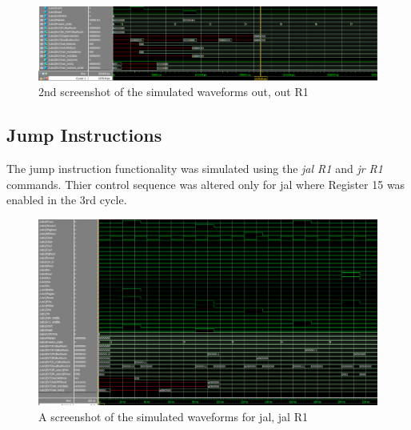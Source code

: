 \documentclass{article}
\begin{document}
        \begin{figure}[h!]
            \begin{center}
                \includegraphics[width=15cm]{out_wave_bottom_half.png}
                \caption{2nd screenshot of the simulated waveforms out, out R1}
            \end{center}
        \end{figure}
    
    \cleardoublepage

    \subsection{Jump Instructions}
    The jump instruction functionality was simulated using the \emph{jal R1} and \emph{jr R1} commands. Thier control sequence was altered only for jal where Register 15 was enabled in the 3rd cycle.
      
        \begin{figure}[h!]
            \begin{center}
                \includegraphics[width=15cm]{jal_wave.png}
                \caption{A screenshot of the simulated waveforms for jal, jal R1}
            \end{center}
        \end{figure}
\end{document}
